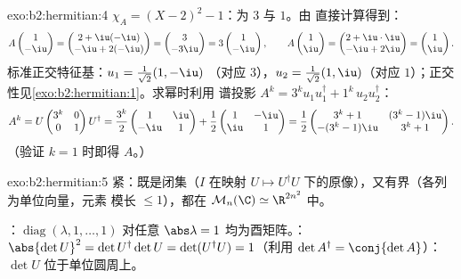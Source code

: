\begin{solution}{exo:b2:hermitian:4}
$\chi_A = (X-2)^2 - 1$：为 $3$ 与 $1$。由
直接计算得到：
\[
A\begin{pmatrix}1\\ -\iu\end{pmatrix}
= \begin{pmatrix} 2 + \iu(-\iu)\\ -\iu + 2(-\iu)\end{pmatrix}
= \begin{pmatrix} 3\\ -3\iu \end{pmatrix}
= 3\begin{pmatrix}1\\ -\iu\end{pmatrix},
\qquad
A\begin{pmatrix}1\\ \iu\end{pmatrix}
= \begin{pmatrix} 2 + \iu\cdot\iu\\ -\iu + 2\iu\end{pmatrix}
= \begin{pmatrix}1\\ \iu\end{pmatrix}.
\]
标准正交特征基：$u_1 = \frac{1}{\sqrt2}(1, -\iu)$
（对应 $3$），$u_2 = \frac{1}{\sqrt2}(1, \iu)$（对应
$1$）；正交性见\cref{exo:b2:hermitian:1}。求幂时利用
谱投影 $A^k = 3^k u_1u_1^\dagger + 1^k\,
u_2u_2^\dagger$：
\[
A^k = U\begin{pmatrix} 3^k & 0\\ 0 & 1\end{pmatrix}U^\dagger
= \frac{3^k}{2}\begin{pmatrix} 1 & \iu\\ -\iu & 1\end{pmatrix}
+ \frac{1}{2}\begin{pmatrix} 1 & -\iu\\ \iu & 1\end{pmatrix}
= \frac12\begin{pmatrix}
3^k + 1 & (3^k - 1)\iu\\
-(3^k-1)\iu & 3^k + 1
\end{pmatrix}.
\]
（验证 $k = 1$ 时即得 $A$。）
\end{solution}

\begin{solution}{exo:b2:hermitian:5}
紧：既是闭集（$I$ 在映射 $U \mapsto
U^\dagger U$ 下的原像），又有界（各列为单位向量，元素
模长 $\leq 1$），都在 $\mathcal{M}_n(\C) \simeq \R^{2n^2}$ 中。

：$\operatorname{diag}(\lambda, 1, \dots, 1)$
对任意 $\abs\lambda = 1$ 均为酉矩阵。：$\abs{\det U}^2 = \det
U^\dagger \det U = \det(U^\dagger U) = 1$（利用 $\det A^\dagger =
\conj{\det A}$）：$\det U$ 位于单位圆周上。
\end{solution}

